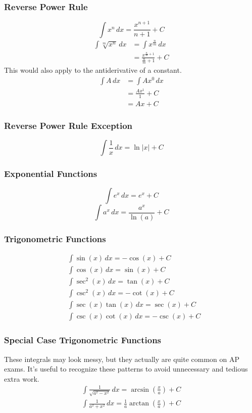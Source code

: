 \documentclass[12pt]{article}
\begin{document}
\subsubsection{Reverse Power Rule}
\[ \int x^n \, dx = \frac{x^{n+1}}{n+1} + C\]
\begin{align*}
    \int \sqrt[m]{x^n} \, dx & = \int x^{\frac{n}{m}} \, dx                      \\[6pt]
                             & = \frac{x^{\frac{n}{m} + 1}}{\frac{n}{m} + 1} + C
\end{align*}
\newline
This would also apply to the antiderivative of a constant.
\begin{align*}
    \int A \, dx & = \int Ax^0 \, dx    \\
                 & = \frac{Ax^1}{1} + C \\[6pt]
                 & = Ax + C
\end{align*}

\subsubsection{Reverse Power Rule Exception}
\[ \int \frac{1}{x} \, dx = \ln |x| + C\]

\subsubsection{Exponential Functions}
\[ \int e^x \, dx = e^x + C \]
\[ \int a^x \, dx = \frac{a^x}{\ln(a)} + C \]

\subsubsection{Trigonometric Functions}
\begin{align*}
     & \int \sin(x) \, dx = -\cos(x) + C        \\[6pt]
     & \int \cos(x) \, dx = \sin(x) + C         \\[6pt]
     & \int \sec^2(x) \, dx = \tan(x) + C       \\[6pt]
     & \int \csc^2(x) \, dx = -\cot(x) + C      \\[6pt]
     & \int \sec(x)\tan(x) \, dx = \sec(x) + C  \\[6pt]
     & \int \csc(x)\cot(x) \, dx = -\csc(x) + C
\end{align*}

\subsubsection{Special Case Trigonometric Functions}
\label{sec:arctanintegral}
These integrals may look messy, but they actually are quite common on AP exams. It's useful to recognize these patterns to avoid unnecessary and tedious extra work.
\begin{gather*}
    \int \frac{1}{\sqrt{a^2 - x^2}} \, dx = \arcsin \left( \frac{x}{a} \right) + C \\[6pt]
    \int \frac{1}{a^2 + x^2} \, dx = \frac{1}{a} \arctan \left( \frac{x}{a} \right) + C
\end{gather*}
\end{document}
